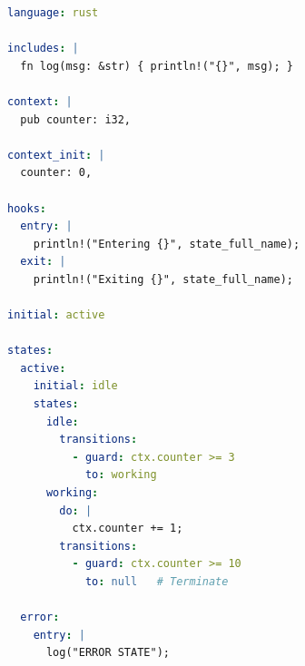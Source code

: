 \documentclass[a4paper,11pt]{article}
\begin{document}
\begin{lstlisting}[language=YAML, caption={Complete SMB example (Rust)}]
language: rust

includes: |
  fn log(msg: &str) { println!("{}", msg); }

context: |
  pub counter: i32,

context_init: |
  counter: 0,

hooks:
  entry: |
    println!("Entering {}", state_full_name);
  exit: |
    println!("Exiting {}", state_full_name);

initial: active

states:
  active:
    initial: idle
    states:
      idle:
        transitions:
          - guard: ctx.counter >= 3
            to: working
      working:
        do: |
          ctx.counter += 1;
        transitions:
          - guard: ctx.counter >= 10
            to: null   # Terminate

  error:
    entry: |
      log("ERROR STATE");
\end{lstlisting}
\end{document}
